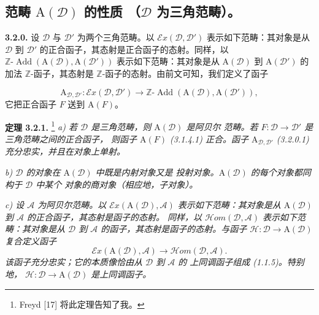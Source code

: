 \clearpage
{}%
\begingroup
\small
\setlength{\parskip}{0pt}%
\setlength{\emergencystretch}{1.5em}%

\subsection{范畴 \texorpdfstring{$\mathrm A(\mathcal D)$}{A(D)} 的性质
  （\texorpdfstring{$\mathcal D$}{D} 为三角范畴）。}

\noindent\textbf{3.2.0.}\quad
设 $\mathcal D$ 与 $\mathcal D'$ 为两个三角范畴。以
$\mathcal E x(\mathcal D,\mathcal D')$ 表示如下范畴：其对象是从
$\mathcal D$ 到 $\mathcal D'$ 的正合函子，其态射是正合函子的态射。同样，以
$\mathbb Z\text{-}\operatorname{Add}(\mathrm A(\mathcal D),
\mathrm A(\mathcal D'))$ 表示如下范畴：其对象是从
$\mathrm A(\mathcal D)$ 到 $\mathrm A(\mathcal D')$ 的加法
$\mathbb Z$-函子，其态射是 $\mathbb Z$-函子的态射。由前文可知，我们定义了函子

\[
\mathrm A_{\mathcal D,\mathcal D'}\colon
\mathcal E x(\mathcal D,\mathcal D')
\longrightarrow
\mathbb Z\text{-}\operatorname{Add}
(\mathrm A(\mathcal D),\mathrm A(\mathcal D')),
\tag{3.2.0.1}
\]
它把正合函子 $F$ 送到 $\mathrm A(F)$。

\medskip
\noindent\textbf{定理 3.2.1.}\begingroup\renewcommand{\thefootnote}{(*)}%
\footnote{Freyd [17] 将此定理告知了我。}\endgroup\quad
\textit{a) 若 $\mathcal D$ 是三角范畴，则 $\mathrm A(\mathcal D)$ 是阿贝尔
范畴。若 $F\colon\mathcal D\to\mathcal D'$ 是三角范畴之间的正合函子，
则函子 $\mathrm A(F)$ (3.1.4.1) 正合。函子
$\mathrm A_{\mathcal D,\mathcal D'}$ (3.2.0.1) 充分忠实，并且在对象上单射。}

\textit{b) $\mathcal D$ 的对象在 $\mathrm A(\mathcal D)$ 中既是内射对象又是
投射对象。$\mathrm A(\mathcal D)$ 的每个对象都同构于 $\mathcal D$ 中某个
对象的商对象（相应地，子对象）。}

\textit{c) 设 $\mathcal A$ 为阿贝尔范畴。以
$\mathcal E x(\mathrm A(\mathcal D),\mathcal A)$ 表示如下范畴：其对象是从
$\mathrm A(\mathcal D)$ 到 $\mathcal A$ 的正合函子，其态射是函子的态射。
同样，以 $\mathcal H\!om(\mathcal D,\mathcal A)$ 表示如下范畴：其对象是从
$\mathcal D$ 到 $\mathcal A$ 的函子，其态射是函子的态射。与函子
$\mathcal H\colon\mathcal D\to\mathrm A(\mathcal D)$ 复合定义函子}
\[
\mathcal E x(\mathrm A(\mathcal D),\mathcal A)
\longrightarrow
\mathcal H\!om(\mathcal D,\mathcal A).
\]
\textit{该函子充分忠实；它的本质像恰由从 $\mathcal D$ 到 $\mathcal A$ 的
上同调函子组成 (1.1.5)。特别地，
$\mathcal H\colon\mathcal D\to\mathrm A(\mathcal D)$ 是上同调函子。}

